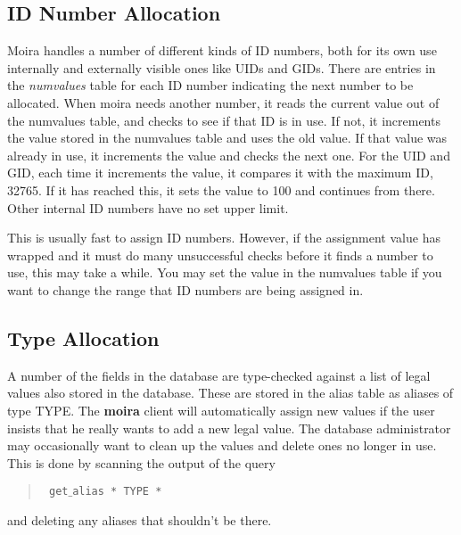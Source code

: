 \documentclass{book}
\begin{document}
\subsection{ID Number Allocation}

Moira handles a number of different kinds of ID numbers, both for its
own use internally and externally visible ones like UIDs and GIDs.
There are entries in the {\em numvalues} table for each ID number
indicating the next number to be allocated.  When moira needs another
number, it reads the current value out of the numvalues table, and
checks to see if that ID is in use.  If not, it increments the value
stored in the numvalues table and uses the old value.  If that value
was already in use, it increments the value and checks the next one.
For the UID and GID, each time it increments the value, it compares it
with the maximum ID, 32765.  If it has reached this, it sets the value
to 100 and continues from there.  Other internal ID numbers have no
set upper limit.

This is usually fast to assign ID numbers.  However, if the assignment
value has wrapped and it must do many unsuccessful checks before it
finds a number to use, this may take a while.  You may set the value
in the numvalues table if you want to change the range that ID numbers
are being assigned in.

\subsection{Type Allocation}

A number of the fields in the database are type-checked against a list
of legal values also stored in the database.  These are stored in the
alias table as aliases of type TYPE.  The {\bf moira} client will
automatically assign new values if the user insists that he really
wants to add a new legal value.  The database administrator may
occasionally want to clean up the values and delete ones no longer in
use.  This is done by scanning the output of the query
\begin{quotation}\tt
get$\_$alias * TYPE *
\end{quotation}
and deleting any aliases that shouldn't be there.

\theindex
{}

\end{document}
